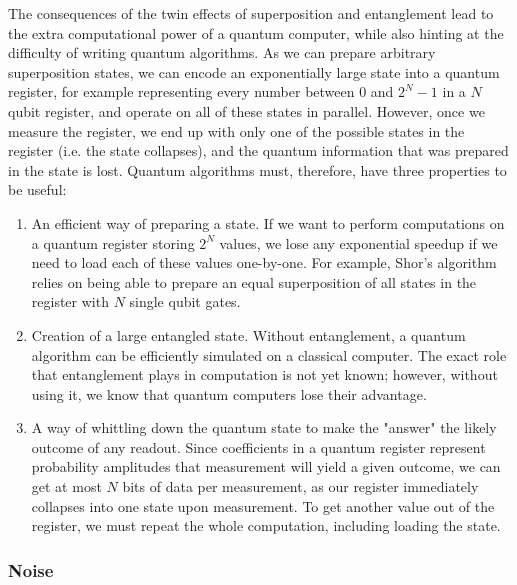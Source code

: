 The consequences of the twin effects of superposition and entanglement lead to the extra computational
power of a quantum computer, while also hinting at the difficulty of writing quantum algorithms. As we
can prepare arbitrary superposition states, we can encode an exponentially large
state into a quantum register, for example representing every number between 0 and $2^N-1$ in a $N$ qubit
register, and operate on all of these states in parallel. However, once we measure the register, we end up
with only one of the possible states in the register (i.e. the state collapses), and the quantum information
that was prepared in the state is lost. Quantum algorithms must, therefore, have three properties to be useful:
\begin{enumerate}
  \item An efficient way of preparing a state. If we want to perform computations on a quantum register
    storing $2^N$ values, we lose any exponential speedup if we need to load each of these values one-by-one.
    For example, Shor's algorithm relies on being able to prepare an equal superposition of all states
    in the register with $N$ single qubit gates\cite{PhysRevA.54.1034}.
  \item Creation of a large entangled state. Without entanglement, a quantum algorithm can be efficiently
    simulated on a classical computer. The exact role that entanglement plays in computation is not yet known;
    however, without using it, we know that quantum computers lose their advantage\cite{doi:10.1098/rspa.2002.1097}.
  \item A way of whittling down the quantum state to make the "answer" the likely outcome of any readout.
    Since coefficients in a quantum register represent probability amplitudes that measurement will yield
    a given outcome, we can get at most $N$ bits of data per measurement\cite{651037}, as our register
    immediately collapses into one state upon measurement. To get another value out of the register,
    we must repeat the whole computation, including loading the state.
\end{enumerate}

\subsubsection{Noise}


